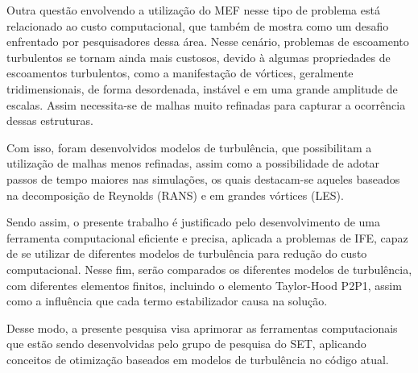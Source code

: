 Outra questão envolvendo a utilização do MEF nesse tipo de problema está relacionado ao custo computacional, que também de mostra como um desafio enfrentado por pesquisadores dessa área. Nesse cenário, problemas de escoamento turbulentos se tornam ainda mais custosos, devido à algumas propriedades de escoamentos turbulentos, como a manifestação de vórtices, geralmente tridimensionais, de forma desordenada, instável e em uma grande amplitude de escalas. Assim necessita-se de malhas muito refinadas para capturar a ocorrência dessas estruturas.

Com isso, foram desenvolvidos modelos de turbulência, que possibilitam a utilização de malhas menos refinadas, assim como a possibilidade de adotar passos de tempo maiores nas simulações, os quais destacam-se aqueles baseados na decomposição de Reynolds (RANS) e em grandes vórtices (LES).

Sendo assim, o presente trabalho é justificado pelo desenvolvimento de uma ferramenta computacional eficiente e precisa, aplicada a problemas de IFE, capaz de se utilizar de diferentes modelos de turbulência para redução do custo computacional. Nesse fim, serão comparados os diferentes modelos de turbulência, com diferentes elementos finitos, incluindo o elemento Taylor-Hood P2P1, assim como a influência que cada termo estabilizador causa na solução.

Desse modo, a presente pesquisa visa aprimorar as ferramentas computacionais que estão sendo desenvolvidas pelo grupo de pesquisa do SET, aplicando conceitos de otimização baseados em modelos de turbulência no código atual.








